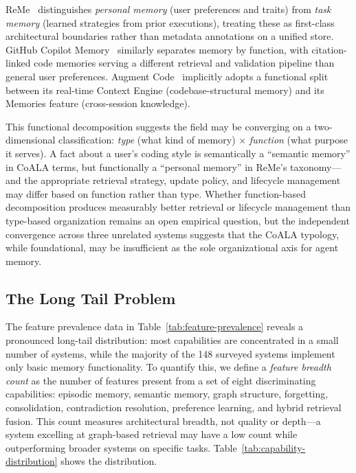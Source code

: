 ReMe~\cite{reme2025} distinguishes \emph{personal memory} (user
preferences and traits) from \emph{task memory} (learned strategies from
prior executions), treating these as first-class architectural
boundaries rather than metadata annotations on a unified store.
GitHub Copilot Memory~\cite{copilot2026} similarly separates memory
by function, with citation-linked code memories serving a different
retrieval and validation pipeline than general user preferences.
Augment Code~\cite{augment2026} implicitly adopts a functional split
between its real-time Context Engine (codebase-structural memory) and
its Memories feature (cross-session knowledge).

This functional decomposition suggests the field may be converging on a
two-dimensional classification: \emph{type} (what kind of memory)
$\times$ \emph{function} (what purpose it serves).  A fact about a
user's coding style is semantically a ``semantic memory'' in CoALA
terms, but functionally a ``personal memory'' in ReMe's taxonomy---and
the appropriate retrieval strategy, update policy, and lifecycle
management may differ based on function rather than type.  Whether
function-based decomposition produces measurably better retrieval or
lifecycle management than type-based organization remains an open
empirical question, but the independent convergence across three
unrelated systems suggests that the CoALA typology, while foundational,
may be insufficient as the sole organizational axis for agent memory.

\subsection{The Long Tail Problem}
\label{sec:long-tail}

The feature prevalence data in Table~\ref{tab:feature-prevalence} reveals a
pronounced long-tail distribution: most capabilities are concentrated in a
small number of systems, while the majority of the 148 surveyed systems
implement only basic memory functionality. To quantify this, we define a
\emph{feature breadth count} as the number of features present from a set of
eight discriminating capabilities: episodic memory, semantic memory, graph
structure, forgetting, consolidation, contradiction resolution, preference
learning, and hybrid retrieval fusion.  This count measures architectural
breadth, not quality or depth---a system excelling at graph-based retrieval
may have a low count while outperforming broader systems on specific tasks.
Table~\ref{tab:capability-distribution} shows the distribution.

